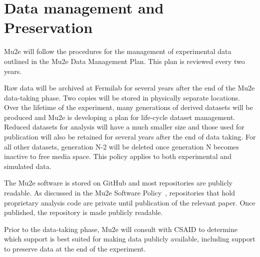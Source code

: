 \section{Data management and Preservation}
\label{sec:datamngt}

Mu2e will follow the procedures for the management of experimental data
outlined in the Mu2e Data Management Plan\cite{Mu2e:DataManagementPlan}. 
This plan is reviewed every two years.

Raw data will be archived at Fermilab for several years after the end of the Mu2e data-taking phase. Two copies will be stored in physically separate locations. Over the lifetime of the experiment, many generations of derived datasets will be produced and Mu2e is developing a plan for life-cycle dataset management. Reduced datasets for analysis will have a much smaller size and those used for publication will also be retained for several years after the end of data taking. For all other datasets, generation N-2 will be deleted once generation N becomes inactive to free media space. This policy applies to both experimental and simulated data.

The Mu2e software is stored on GitHub and most repositories are publicly readable. As discussed in the Mu2e Software Policy~\cite{Mu2e:SoftwarePolicy}, repositories that hold proprietary analysis code are private until publication of the relevant paper. Once published, the repository is made publicly readable.

Prior to the data-taking phase, Mu2e will consult with CSAID to determine which support is best suited for making data publicly available, including support to preserve data at the end of the experiment.